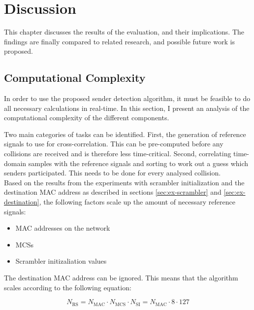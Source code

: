 
\chapter{Discussion}\label{ch:Discussion}
\glsresetall %

This chapter discusses the results of the evaluation, and their implications. The findings are finally compared to related research, and possible future work is proposed.



\section{Computational Complexity}\label{sec:complexity}

In order to use the proposed sender detection algorithm, it must be feasible to do all necessary calculations in real-time. In this section, I present an analysis of the computational complexity of the different components.

Two main categories of tasks can be identified. First, the generation of reference signals to use for cross-correlation. This can be pre-computed before any collisions are received and is therefore less time-critical. Second, correlating time-domain samples with the reference signals and sorting to work out a guess which senders participated. This needs to be done for every analysed collision.\\

Based on the results from the experiments with scrambler initialization and the destination \gls{MAC} address as described in sections \ref{sec:ex-scrambler} and \ref{sec:ex-destination}, the following factors scale up the amount of necessary reference signals:

\begin{itemize}
  \item \gls{MAC} addresses on the network
  \item \glspl{MCS}
  \item Scrambler initizaliation values
\end{itemize}

The destination \gls{MAC} address can be ignored. This means that the algorithm scales according to the following equation:

$$ N_{\text{RS}} = N_{\text{MAC}} \cdot N_{\text{MCS}} \cdot N_{\text{SI}} = N_{\text{MAC}} \cdot 8 \cdot 127 $$\vspace{0cm}

